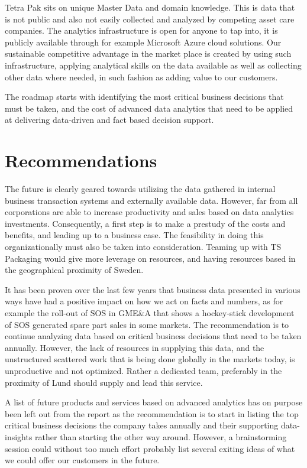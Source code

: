\documentclass[10pt]{article} %
\begin{document}
Tetra Pak sits on unique Master Data and domain knowledge. This is data that is not public and also not easily collected and analyzed by competing asset care companies. The analytics infrastructure is open for anyone to tap into, it is publicly available through for example Microsoft Azure cloud solutions. Our sustainable competitive advantage in the market place is created by using such infrastructure, applying analytical skills on the data available as well as collecting other data where needed, in such fashion as adding value to our customers. 

The roadmap starts with identifying the most critical business decisions that must be taken, and the cost of advanced data analytics that need to be applied at delivering data-driven and fact based decision support.

\section{Recommendations}

The future is clearly geared towards utilizing the data gathered in internal business transaction systems and externally available data. However, far from all corporations are able to increase productivity and sales based on data analytics investments. Consequently, a first step is to make a prestudy of the costs and benefits, and leading up to a business case. The feasibility in doing this organizationally must also be taken into consideration. Teaming up with TS Packaging would give more leverage on resources, and having resources based in the geographical proximity of Sweden.

It has been proven over the last few years that business data presented in various ways have had a positive impact on how we act on facts and numbers, as for example the roll-out of SOS in GME\&A that shows a hockey-stick development of SOS generated spare part sales in some markets. The recommendation is to continue analyzing data based on critical business decisions that need to be taken annually. However, the lack of resources in supplying this data, and the unstructured scattered work that is being done globally in the markets today, is unproductive and not optimized. Rather a dedicated team, preferably in the proximity of Lund should supply and lead this service.

A list of future products and services based on advanced analytics has on purpose been left out from the report as the recommendation is to start in listing the top critical business decisions the company takes annually and their supporting data-insights rather than starting the other way around. However, a brainstorming session could without too much effort probably list several exiting ideas of what we could offer our customers in the future.
\end{document}
